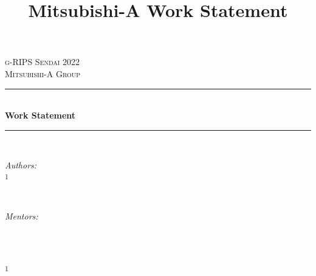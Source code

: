 \documentclass{article}
\title{Mitsubishi-A Work Statement}
\author{}
\date{}
\theoremstyle{definition}
\begin{document}
\begin{titlepage}

\newcommand{\HRule}{\rule{\linewidth}{0.5mm}} %

\center %
 

\textsc{\LARGE g-RIPS Sendai 2022}\\[1.5cm] %
\textsc{\Large Mitsubishi-A Group}\\[0.5cm] %


\HRule \\[0.4cm]
{ \huge \bfseries Work Statement}\\[0.4cm] %
\HRule \\[1.5cm]
 

\begin{minipage}{0.4\textwidth}
\begin{flushleft} \large
\emph{Authors:}\\
 \textsc{}\textsuperscript{1} \\ %
 \textsc{}\textsuperscript{}
\end{flushleft}
\end{minipage}
~
\begin{minipage}{0.4\textwidth}
\begin{flushright} \large
\emph{Mentors:} \\
 \textsc{}\textsuperscript{} \\%
 \textsc{}\textsuperscript{} 
\end{flushright}
\end{minipage}\\[0.5cm]
\center\begin{minipage}{0.35\textwidth}
\begin{flushleft}\small
\textsuperscript{1} %
\end{flushleft}
\end{minipage}\\[2cm]


\end{titlepage}
\end{document}
